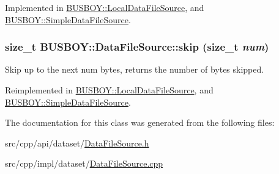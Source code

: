 Implemented in \hyperlink{classBUSBOY_1_1LocalDataFileSource_a6c452d0aa712dac330e68e4de6b77ce9}{BUSBOY::LocalDataFileSource}, and \hyperlink{classBUSBOY_1_1SimpleDataFileSource_a941e4ec1d63751ff8c5cb4b6b8c3b2cf}{BUSBOY::SimpleDataFileSource}.\hypertarget{classBUSBOY_1_1DataFileSource_ab50fe5821ccaa51a26b65debe8fd1c84}{
\subsubsection[{skip}]{\setlength{\rightskip}{0pt plus 5cm}size\_\-t BUSBOY::DataFileSource::skip (size\_\-t {\em num})}}
\label{classBUSBOY_1_1DataFileSource_ab50fe5821ccaa51a26b65debe8fd1c84}


Skip up to the next num bytes, returns the number of bytes skipped. 

Reimplemented in \hyperlink{classBUSBOY_1_1LocalDataFileSource_afe40ac6d9ab78d27b52be6ba234849d4}{BUSBOY::LocalDataFileSource}, and \hyperlink{classBUSBOY_1_1SimpleDataFileSource_ad0cd565fa57bdac5f9d1c971590dbe2b}{BUSBOY::SimpleDataFileSource}.

The documentation for this class was generated from the following files:\begin{DoxyCompactItemize}
\item 
src/cpp/api/dataset/\hyperlink{DataFileSource_8h}{DataFileSource.h}\item 
src/cpp/impl/dataset/\hyperlink{DataFileSource_8cpp}{DataFileSource.cpp}\end{DoxyCompactItemize}
